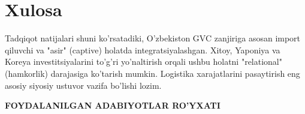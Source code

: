 \documentclass[14pt,a4paper]{extarticle}
\begin{document}
\newpage
\section{Xulosa}
Tadqiqot natijalari shuni ko'rsatadiki, O'zbekiston GVC zanjiriga asosan import qiluvchi va "asir" (captive) holatda integratsiyalashgan. Xitoy, Yaponiya va Koreya investitsiyalarini to'g'ri yo'naltirish orqali ushbu holatni "relational" (hamkorlik) darajasiga ko'tarish mumkin. Logistika xarajatlarini pasaytirish eng asosiy siyosiy ustuvor vazifa bo'lishi lozim.

\newpage
\begin{center}
    \textbf{\MakeUppercase{Foydalanilgan adabiyotlar ro'yxati}}
\end{center}


\end{document}
